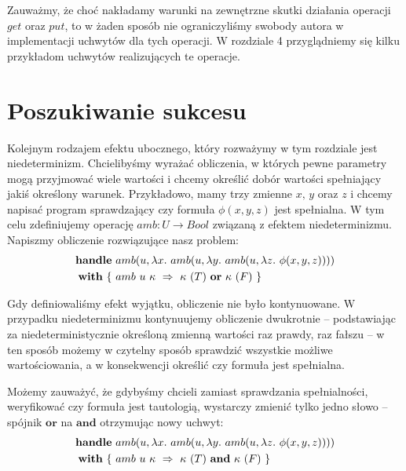 \documentclass[shortabstract]{iithesis}
\begin{document}
Zauważmy, że choć nakładamy warunki na zewnętrzne skutki działania operacji \(get\) oraz \(put\), to w żaden sposób nie ograniczyliśmy swobody autora w implementacji uchwytów dla tych operacji. W rozdziale 4 przyglądniemy się kilku przykładom uchwytów realizujących te operacje.

\section{Poszukiwanie sukcesu}

Kolejnym rodzajem efektu ubocznego, który rozważymy w tym rozdziale jest niedeterminizm. Chcielibyśmy wyrażać obliczenia, w których pewne parametry mogą przyjmować wiele wartości i chcemy określić dobór wartości spełniający jakiś określony warunek. Przykładowo, mamy trzy zmienne \(x,\, y\) oraz \(z\) i chcemy napisać program sprawdzający czy formuła \(\phi(x, y, z)\) jest spełnialna. W tym celu zdefiniujemy operację \(amb: U \rightarrow \mathit{Bool}\) związaną z efektem niedeterminizmu. Napiszmy obliczenie rozwiązujące nasz problem:
\begin{equation}\begin{split}
  \handle{
    &\op{amb}{u}{\fun{x}{
        \op{amb}{u}{\fun{y}{
            \op{amb}{u}{\fun{z}{
                \phi(x, y, z)
            }}
        }}
    }}\\
  }{ \{ \ &\hcase{amb}{u\ \kappa}{ \kappa\ (T) \ \mathbf{or} \ \kappa\ (F) } \ \} }
\end{split}\end{equation}

Gdy definiowaliśmy efekt wyjątku, obliczenie nie było kontynuowane. W przypadku niedeterminizmu kontynuujemy obliczenie dwukrotnie -- podstawiając za niedeterministycznie określoną zmienną wartości raz prawdy, raz fałszu -- w ten sposób możemy w czytelny sposób sprawdzić wszystkie możliwe wartościowania, a w konsekwencji określić czy formuła jest spełnialna.

Możemy zauważyć, że gdybyśmy chcieli zamiast sprawdzania spełnialności, weryfikować czy formuła jest tautologią, wystarczy zmienić tylko jedno słowo -- spójnik \(\mathbf{or}\) na \(\mathbf{and}\) otrzymując nowy uchwyt:
\begin{equation}\begin{split}
  \handle{
    &\op{amb}{u}{\fun{x}{
        \op{amb}{u}{\fun{y}{
            \op{amb}{u}{\fun{z}{
                \phi(x, y, z)
            }}
        }}
    }}\\
  }{ \{ \ &\hcase{amb}{u\ \kappa}{ \kappa\ (T) \ \mathbf{and} \ \kappa\ (F) } \ \} }
\end{split}\end{equation}
\end{document}
